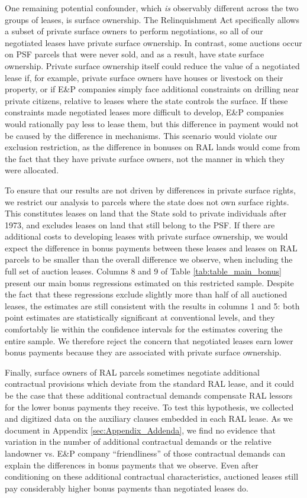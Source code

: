 One remaining potential confounder, which \emph{is} observably different across the two groups of leases, is surface ownership. The Relinquishment Act specifically allows a subset of private surface owners to perform negotiations, so all of our negotiated leases have private surface ownership. In contrast, some auctions occur on PSF parcels that were never sold, and as a result, have state surface ownership.  Private surface ownership itself could reduce the value of a negotiated lease if, for example, private surface owners have houses or livestock on their property, or if E\&P companies simply face additional constraints on drilling near private citizens, relative to leases where the state controls the surface. If these constraints made negotiated leases more difficult to develop, E\&P companies would rationally pay less to lease them, but this difference in payment would not be caused by the difference in mechanisms. This scenario would violate our exclusion restriction, as the difference in bonuses on RAL lands would come from the fact that they have private surface owners, not the manner in which they were allocated.

To ensure that our results are not driven by differences in private surface rights, we restrict our analysis to parcels where the state does not own surface rights. This constitutes leases on land that the State sold to private individuals after 1973, and excludes leases on land that still belong to the PSF.  If there are additional costs to developing leases with private surface ownership, we would expect the difference in bonus payments between these leases and leases on RAL parcels to be smaller than the overall difference we observe, when including the full set of auction leases. Columns 8 and 9 of Table \ref{tab:table_main_bonus} present our main bonus regressions estimated on this restricted sample. Despite the fact that these regressions exclude slightly more than half of all auctioned leases, the estimates are still consistent with the results in columns 1 and 5: both point estimates are statistically significant at conventional levels, and they comfortably lie within the confidence intervals for the estimates covering the entire sample.  We therefore reject the concern that negotiated leases earn lower bonus payments because they are associated with private surface ownership.

Finally, surface owners of RAL parcels sometimes negotiate additional contractual provisions which deviate from the standard RAL lease, and it could be the case that these additional contractual demands compensate RAL lessors for the lower bonus payments they receive.  To test this hypothesis, we collected and digitized data on the auxiliary clauses embedded in each RAL lease.  As we document in Appendix \ref{sec:Appendix_Addenda}, we find no evidence that variation in the number of additional contractual demands or the relative landowner vs. E\&P company ``friendliness'' of those contractual demands can explain the differences in bonus payments that we observe.   Even after conditioning on these additional contractual characteristics, auctioned leases still pay considerably higher bonus payments than negotiated leases do.

